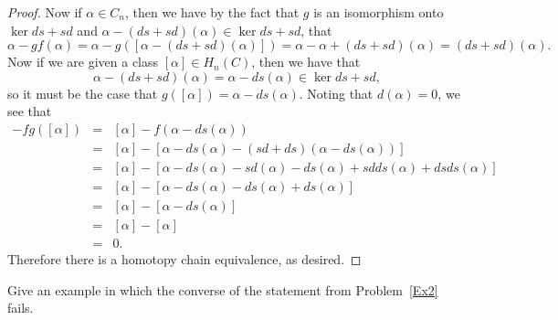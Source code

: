 \documentclass[10pt]{amsart}
\begin{document}
\begin{thm}
\begin{proof}
    Now if $\alpha \in C_n$, then we have by the fact that $g$ is an isomorphism onto $\ker ds + sd$ and $\alpha - (ds + sd)(\alpha) \in \ker ds + sd$, that
    $$\alpha - gf(\alpha) = \alpha - g([\alpha - (ds + sd)(\alpha)]) = \alpha - \alpha + (ds + sd)(\alpha) = (ds + sd)(\alpha).$$
    Now if we are given a class $[\alpha] \in H_n(C)$, then we have that
    $$\alpha - (ds + sd)(\alpha) = \alpha - ds(\alpha) \in \ker ds + sd,$$
    so it must be the case that $g([\alpha]) = \alpha - ds(\alpha)$.
    Noting that $d(\alpha) = 0$, we see that
    \begin{eqnarray*}
      [\alpha] - fg([\alpha]) &=& [\alpha] - f(\alpha - ds(\alpha))\\
      &=& [\alpha] - [\alpha - ds(\alpha) - (sd + ds)(\alpha - ds(\alpha))]\\
      &=& [\alpha] - [\alpha - ds(\alpha) - sd(\alpha) - ds(\alpha) + sdds(\alpha) + dsds(\alpha)]\\
      &=& [\alpha] - [\alpha - ds(\alpha) - ds(\alpha) + ds(\alpha)]\\
      &=& [\alpha] - [\alpha - ds(\alpha)]\\
      &=& [\alpha] - [\alpha]\\
      &=& 0.
    \end{eqnarray*}
    Therefore there is a homotopy chain equivalence, as desired.
  \end{proof}
\end{thm}

\begin{thm}
  Give an example in which the converse of the statement from Problem~\ref{Ex2} fails.
\end{thm}
\end{document}
